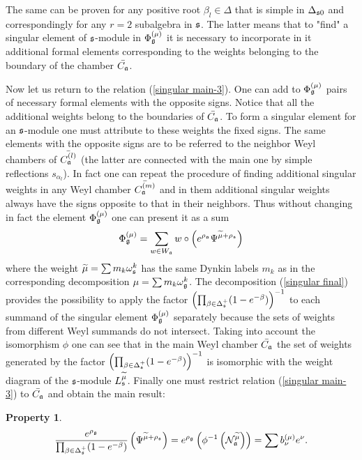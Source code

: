 \documentclass[12pt]{article}
\newtheorem{Prop}[Def]{Property}
\begin{document}
The same can be proven for any positive root $\beta_l \in \Delta$ that is simple in $\Delta_{\frak{s}0}$ and correspondingly for any $r=2$ subalgebra in $\frak{s}$. The latter means that to "find" a singular element of $\frak{s}$-module in $\Phi_{\frak{g}} ^{\left( \mu \right) }$ it is necessary to incorporate in it additional formal elements corresponding to the weights belonging to the boundary of the chamber $\bar{C_{\frak{a}}}$. 

Now let us return to the relation (\ref{singular main-3}). One can add to $\Phi_{\frak{g}} ^{\left( \mu \right) }$ pairs of necessary formal elements with the opposite  signs.  Notice that all the additional weights belong to the boundaries of $\bar{C_{\frak{a}}}$. To form a singular element for an $\frak{s}$-module one must attribute to these weights the fixed signs. The same elements with the opposite signs are to be referred to the neighbor Weyl chambers of $\bar{C^{(l)}_{\frak{a}}}$ (the latter are connected with the main one by simple reflections $s_{\alpha_l}$). In fact one can repeat the procedure of finding additional singular weights in any Weyl chamber $\bar{C^{(m)}_{\frak{a}}}$ and in them additional singular weights always have the signs opposite to that in their neighbors. Thus without changing in fact the element $\Phi_{\frak{g}} ^{\left( \mu \right) }$ one can present it as a sum  
\begin{equation}
\Phi_{\frak{g}} ^{\left( \mu \right) }=\sum_{w \in W_{\frak{a}}} w \circ \left(e^{\rho_{\frak{a}}}\Psi^{\widetilde{\mu} + \rho_{\frak{s}}}\right)
\label{singular final}
\end{equation}
where the weight $\widetilde{\mu}=\sum m_k \omega_{\frak{s}}^k$ has the same Dynkin labels $m_k$ as in the corresponding decomposition $\mu=\sum m_k \omega_{\frak{g}}^k$. 
The decomposition (\ref{singular final}) provides the possibility to apply the factor
$\left(\prod_{\beta \in \Delta_{\frak{s}} ^{+}}(1-e^{-\beta })\right)^{-1}$ to each summand of the singular element $\Phi_{\frak{g}} ^{\left( \mu \right) }$ separately because the sets of weights from different Weyl summands do not intersect. Taking into account the isomorphism $\phi$ one can see that in the main Weyl chamber $\bar{C_{\frak{a}}}$ the set of weights generated by the factor $\left(\prod_{\beta \in \Delta_{\frak{s}} ^{+}}(1-e^{-\beta })\right)^{-1}$ is isomorphic with the weight diagram of the $\frak{s}$-module $L^{\widetilde{\mu}}_{\frak{s}}$. Finally one must restrict relation (\ref{singular main-3}) to 
$\bar{C_{\frak{a}}}$ and obtain the main result:
\begin{Prop}
\begin{equation}
 \frac{e^{\rho_{\frak{g}}}}{\prod_{\beta \in \Delta_{\frak{s}} ^{+}}(1-e^{-\beta })}\left(\Psi^{\widetilde{\mu} + \rho_{\frak{s}}}\right)
=e^{\rho_{\frak{g}}}\left( \phi^{-1}\left( \mathcal{N}_{\frak{a}}^{\widetilde{\mu}
}\right)  \right)
=
\sum b_{\nu }^{(\mu )}e^{\nu}.
\label{singular main-4}
\end{equation}
\end{Prop}
\end{document}
